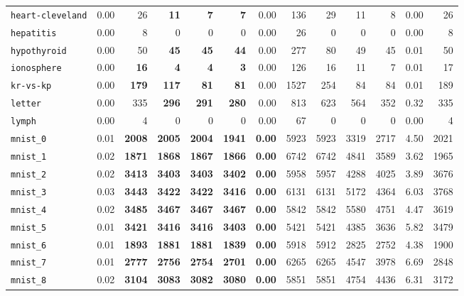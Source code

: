 \begin{tabular}{lrrrrrrrrrrrr}
\texttt{heart-cleveland} & 0.00 & 26 & \textbf{11} & \textbf{7} & \textbf{7} & 0.00 & 136 & 29 & 11 & 8 & 0.00 & 26\\
\texttt{hepatitis} & 0.00 & 8 & 0 & 0 & 0 & 0.00 & 26 & 0 & 0 & 0 & 0.00 & 8\\
\texttt{hypothyroid} & 0.00 & 50 & \textbf{45} & \textbf{45} & \textbf{44} & 0.00 & 277 & 80 & 49 & 45 & 0.01 & 50\\
\texttt{ionosphere} & 0.00 & \textbf{16} & \textbf{4} & \textbf{4} & \textbf{3} & 0.00 & 126 & 16 & 11 & 7 & 0.01 & 17\\
\texttt{kr-vs-kp} & 0.00 & \textbf{179} & \textbf{117} & \textbf{81} & \textbf{81} & 0.00 & 1527 & 254 & 84 & 84 & 0.01 & 189\\
\texttt{letter} & 0.00 & 335 & \textbf{296} & \textbf{291} & \textbf{280} & 0.00 & 813 & 623 & 564 & 352 & 0.32 & 335\\
\texttt{lymph} & 0.00 & 4 & 0 & 0 & 0 & 0.00 & 67 & 0 & 0 & 0 & 0.00 & 4\\
\texttt{mnist\_0} & 0.01 & \textbf{2008} & \textbf{2005} & \textbf{2004} & \textbf{1941} & \textbf{0.00} & 5923 & 5923 & 3319 & 2717 & 4.50 & 2021\\
\texttt{mnist\_1} & 0.02 & \textbf{1871} & \textbf{1868} & \textbf{1867} & \textbf{1866} & \textbf{0.00} & 6742 & 6742 & 4841 & 3589 & 3.62 & 1965\\
\texttt{mnist\_2} & 0.02 & \textbf{3413} & \textbf{3403} & \textbf{3403} & \textbf{3402} & \textbf{0.00} & 5958 & 5957 & 4288 & 4025 & 3.89 & 3676\\
\texttt{mnist\_3} & 0.03 & \textbf{3443} & \textbf{3422} & \textbf{3422} & \textbf{3416} & \textbf{0.00} & 6131 & 6131 & 5172 & 4364 & 6.03 & 3768\\
\texttt{mnist\_4} & 0.02 & \textbf{3485} & \textbf{3467} & \textbf{3467} & \textbf{3467} & \textbf{0.00} & 5842 & 5842 & 5580 & 4751 & 4.47 & 3619\\
\texttt{mnist\_5} & 0.01 & \textbf{3421} & \textbf{3416} & \textbf{3416} & \textbf{3403} & \textbf{0.00} & 5421 & 5421 & 4385 & 3636 & 5.82 & 3479\\
\texttt{mnist\_6} & 0.01 & \textbf{1893} & \textbf{1881} & \textbf{1881} & \textbf{1839} & \textbf{0.00} & 5918 & 5912 & 2825 & 2752 & 4.38 & 1900\\
\texttt{mnist\_7} & 0.01 & \textbf{2777} & \textbf{2756} & \textbf{2754} & \textbf{2701} & \textbf{0.00} & 6265 & 6265 & 4547 & 3978 & 6.69 & 2848\\
\texttt{mnist\_8} & 0.02 & \textbf{3104} & \textbf{3083} & \textbf{3082} & \textbf{3080} & \textbf{0.00} & 5851 & 5851 & 4754 & 4436 & 6.31 & 3172\\

\end{tabular}

